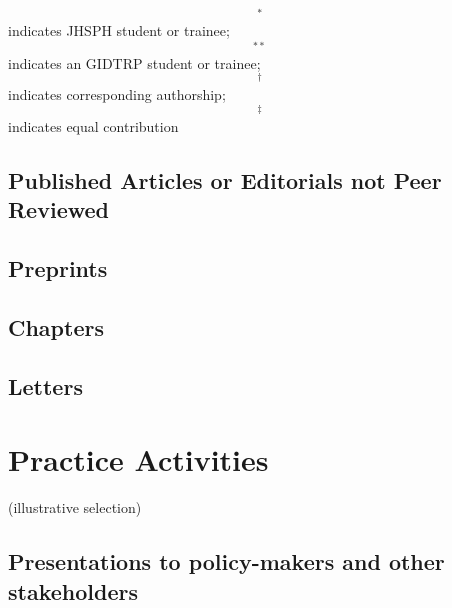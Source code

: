 \documentclass[martgin, line]{article}
\begin{document}
\begin{footnotesize}$$^*$$ indicates JHSPH student or trainee;
    $$^{**}$$ indicates an GIDTRP student or trainee;
    $$^\dagger$$ indicates corresponding authorship;
    $$^\ddagger$$ indicates equal contribution
  \end{footnotesize}

\begin{enumerate}
  
\end{enumerate}



\subsection*{Published Articles or Editorials not Peer Reviewed}

\begin{enumerate}
  
\end{enumerate}


\subsection*{Preprints}

\begin{enumerate}
  
\end{enumerate}


\subsection*{Chapters}

\begin{enumerate}
  
\end{enumerate}

\subsection*{Letters}

\begin{enumerate}
  
\end{enumerate}


\section*{Practice Activities}

(illustrative selection)

\subsection*{Presentations to policy-makers and other stakeholders}
\end{document}
